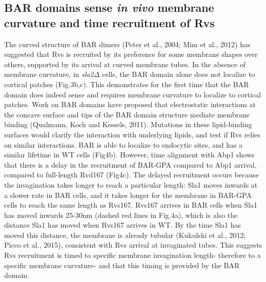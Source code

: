 \documentclass[9pt,lineno]{elife}
\begin{document}
\subsection{BAR domains sense \textit{in vivo} membrane curvature and time recruitment of Rvs}

The curved structure of BAR dimers (Peter et al., 2004; Mim et al., 2012) has suggested that Rvs is recruited by its preference for some membrane shapes over others, supported by its arrival at curved membrane tubes. In the absence of membrane curvature, in  \textit{sla2$\Delta$}  cells, the BAR domain alone does not localize to cortical patches (Fig.3b,c). This demonstrates for the first time that the BAR domain does indeed sense and requires membrane curvature to localize to cortical patches. Work on BAR domains have proposed that electrostatic interactions at the concave surface and tips of the BAR domain structure mediate membrane binding (Qualmann, Koch and Kessels, 2011). Mutations in these lipid-binding surfaces would clarify the interaction with underlying lipids, and test if Rvs relies on similar interactions.
BAR is able to localize to endocytic sites, and has a similar lifetime in WT cells (Fig4b). However, time alignment with Abp1 shows that there is a delay in the recruitment of BAR-GPA compared to Abp1 arrival, compared to full-length Rvd167 (Fig4c). The delayed recruitment occurs because the invagination takes longer to reach a particular length: Sla1 moves inwards at a slower rate in BAR cells, and it takes longer for the membrane in BAR-GPA cells to reach the same length as Rvs167. Rvs167 arrives in BAR cells when Sla1 has moved inwards 25-30nm (dashed red lines in Fig.4a), which is also the distance Sla1 has moved when Rvs167 arrives in WT. By the time Sla1 has moved this distance, the membrane is already tubular (Kukulski et al., 2012; Picco et al., 2015), consistent with Rvs arrival at invaginated tubes. This suggests Rvs recruitment is timed to specific membrane invagination length- therefore to a specific membrane curvature- and that this timing is provided by the BAR domain.
\end{document}
